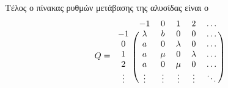 \documentclass[a4paper,11pt]{article}
\begin{document}
Τέλος ο πίνακας ρυθμών μετάβασης της αλυσίδας είναι ο
\[
	Q =
	\begin{blockarray}{cccccc}
		& -1 & 0 & 1 & 2 & \dots \\
		\begin{block}{c(ccccc)}
			-1 & \lambda & b & 0 & 0 & \dots \\
			0 & a & 0 & \lambda & 0 & \dots \\
			1 & a & \mu & 0 & \lambda & \dots \\
			2 & a & 0 & \mu & 0 & \dots \\
			\vdots & \vdots & \vdots & \vdots & \vdots & \ddots \\
		\end{block}
	\end{blockarray}
\]
\end{document}
